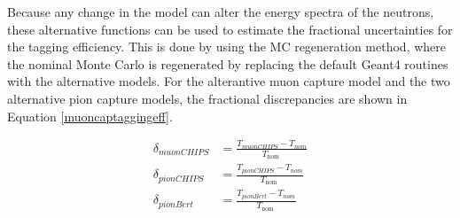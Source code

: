 Because any change in the model can alter the energy spectra of the neutrons, these alternative functions can be used to estimate the fractional uncertainties for the tagging efficiency. This is done by using the MC regeneration method, where the nominal Monte Carlo is regenerated by replacing the default Geant4 routines with the alternative models. For the alterantive muon capture model and the two alternative pion capture models, the fractional discrepancies are shown in Equation \ref{muoncaptaggingeff}.

\begin{equation}
    \begin{aligned}
        \delta_{muon C H I P S} &=\frac{T_{muon C H I P S}-T_{n o m}}{T_{\text {nom }}} \\
        \delta_{pion C H I P S} &=\frac{T_{pion C H I P S}-T_{n o m}}{T_{\text {nom }}} \\
        \delta_{pion B e r t} &=\frac{T_{pion B e r t}-T_{n o m}}{T_{\text {nom }}}
        \end{aligned}
        \label{muoncaptaggingeff}
\end{equation}

